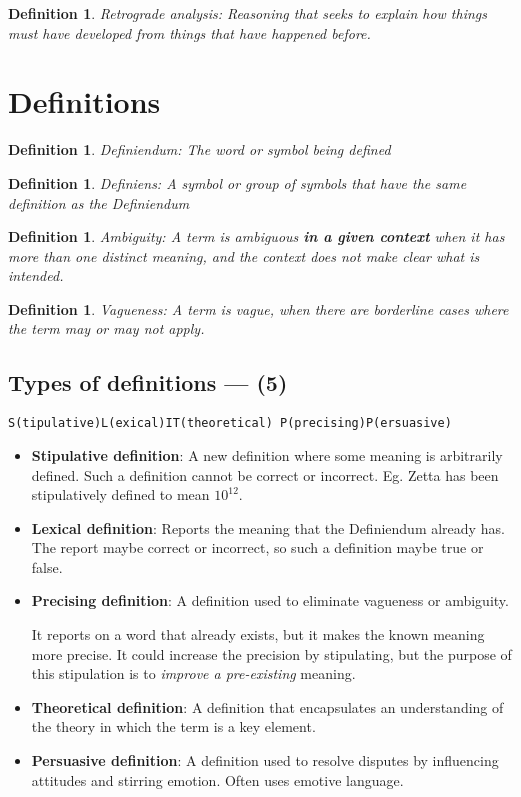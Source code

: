 \documentclass[5pt]{book}
\newtheorem{definition}[theorem]{Definition}
\begin{document}
\begin{definition}
    Retrograde analysis: Reasoning that seeks to explain how things
    must have developed from things that have happened before.
\end{definition}

\section{Definitions}
\begin{definition}
    Definiendum: The word or symbol being defined
\end{definition}

\begin{definition}
    Definiens: A symbol or group of symbols that have the same definition
    as the Definiendum
\end{definition}

\begin{definition}
    Ambiguity: A term is ambiguous \textbf{in a given context} when it
    has more than one distinct meaning, and the context does not make clear
    what is intended.
\end{definition}

\begin{definition}
    Vagueness: A term is vague, when there are borderline cases where the
    term may or may not apply.
\end{definition}

\subsection{Types of definitions --- (5)}
\texttt{S(tipulative)L(exical)IT(theoretical) P(precising)P(ersuasive)}

\begin{itemize}
    \item \textbf{Stipulative definition}: A new definition where some meaning is
        arbitrarily defined. Such a definition cannot be correct or incorrect.
        Eg. Zetta has been stipulatively defined to mean $10^{12}$.
    \item \textbf{Lexical definition}: Reports the meaning that the Definiendum
        already has. The report maybe correct or incorrect, so such a definition
        maybe true or false.
    \item \textbf{Precising definition}: A definition used to eliminate 
        vagueness or ambiguity.

        It reports on a word that already exists, but it makes the known
        meaning more precise. It could increase the precision by stipulating,
        but the purpose of this stipulation is to \textit{improve a pre-existing}
        meaning.

    \item \textbf{Theoretical definition}: A definition that encapsulates
        an understanding of the theory in which the term is a key element.
    \item \textbf{Persuasive definition}: A definition used to resolve
        disputes  by influencing attitudes and stirring emotion. Often
        uses emotive language.
\end{itemize}
\end{document}
